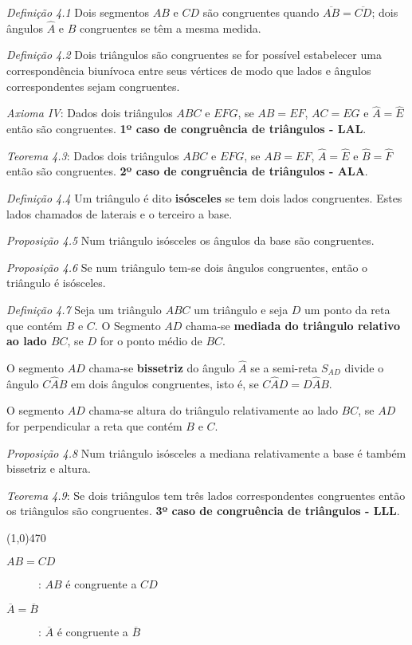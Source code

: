 \documentclass[11pt]{article}
\begin{document}
\emph{Definição 4.1} Dois segmentos $AB$ e $CD$ são congruentes quando
$\overline{AB} = \overline{CD}$; dois ângulos $\hat{A}$ e $\hat{B}$ congruentes
se têm a mesma medida.

\emph{Definição 4.2} Dois triângulos são congruentes se for possível
estabelecer uma correspondência biunívoca entre seus vértices de modo que lados
e ângulos correspondentes sejam congruentes.

\emph{Axioma IV}: Dados dois triângulos $ABC$ e $EFG$, se $AB = EF$, $AC = EG$
e $\hat{A} = \hat{E}$ então são congruentes.
\textbf{1º caso de congruência de triângulos - LAL}.

\emph{Teorema 4.3}: Dados dois triângulos $ABC$ e $EFG$, se $AB = EF$,
$\hat{A} = \hat{E}$ e $\hat{B} = \hat{F}$ então são
congruentes.
\textbf{2º caso de congruência de triângulos - ALA}.

\emph{Definição 4.4} Um triângulo é dito \textbf{isósceles} se tem dois lados
congruentes. Estes lados chamados de laterais e o terceiro a base.

\emph{Proposição 4.5} Num triângulo isósceles os ângulos da base são
congruentes.

\emph{Proposição 4.6} Se num triângulo tem-se dois ângulos congruentes, então o
triângulo é isósceles.

\emph{Definição 4.7} Seja um triângulo $ABC$ um triângulo e seja $D$ um ponto
da reta que contém $B$ e $C$. O Segmento $AD$ chama-se \textbf{mediada do
triângulo relativo ao lado $BC$}, se $D$ for o ponto médio de $BC$.

O segmento $AD$ chama-se \textbf{bissetriz} do ângulo $\hat{A}$ se a semi-reta
$S_{AD}$ divide o ângulo $C\hat{A}B$ em dois ângulos congruentes, isto é, se
$C\hat{A}D = D\hat{A}B$.

O segmento $AD$ chama-se altura do triângulo relativamente ao lado $BC$, se
$AD$ for perpendicular a reta que contém $B$ e $C$.

\emph{Proposição 4.8} Num triângulo isósceles a mediana relativamente a base é
também bissetriz e altura.

\emph{Teorema 4.9}: Se dois triângulos tem três lados correspondentes
congruentes então os triângulos são congruentes.
\textbf{3º caso de congruência de triângulos - LLL}.

\line(1,0){470}

\begin{description}
  \item[$AB = CD$]: $AB$ é congruente a $CD$
  \item[$\overline{A} = \overline{B}$]: $\overline{A}$ é congruente a
    $\overline{B}$
\end{description}
\end{document}
